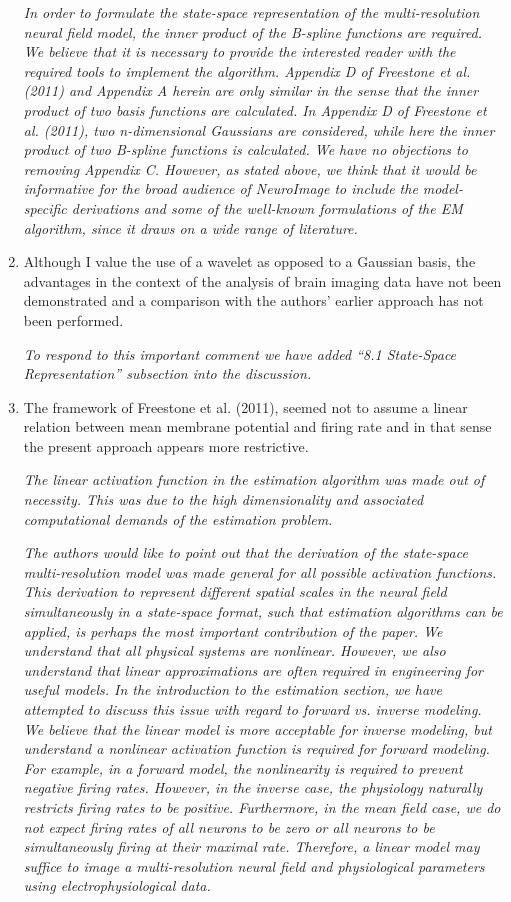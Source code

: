 \documentclass{article}
\begin{document}
\begin{enumerate}
\emph{In order to formulate the state-space representation of the multi-resolution neural field model, the inner product of the B-spline functions are required. We believe that it is necessary to provide the interested reader with the required tools to implement the algorithm. Appendix D of Freestone et al. (2011) and Appendix A herein are only similar in the sense that the inner product of two basis functions are calculated. In Appendix D of Freestone et al. (2011), two  n-dimensional Gaussians are considered, while here the inner product of two B-spline functions is calculated. We have no objections to removing Appendix C. However, as stated above, we think that it would be informative for the broad audience of NeuroImage to include the model-specific derivations and some of the well-known formulations of the EM algorithm, since it draws on a wide range of literature.}

        \item Although I value the use of a wavelet as opposed to a Gaussian basis, the advantages in the context of the analysis of brain imaging data have not been demonstrated and a comparison with the authors' earlier approach has not been performed.  

\emph{To respond to this important comment we have added ``8.1 State-Space Representation'' subsection into the discussion.}

		\item{The framework of Freestone et al. (2011), seemed not to assume a linear relation between mean membrane potential and firing rate and in that sense the present approach appears more restrictive.}

\emph{The linear activation function in the estimation algorithm was made out of necessity. This was due to the high dimensionality and associated computational demands of the estimation problem.}

\emph{The authors would like to point out that the derivation of the state-space multi-resolution model was made general for all possible activation functions. This derivation to represent different spatial scales in the neural field simultaneously in a state-space format, such that estimation algorithms can be applied, is perhaps the most important contribution of the paper. We understand that all physical systems are nonlinear. However, we also understand that linear approximations are often required in engineering for useful models. In the introduction to the estimation section, we have attempted to discuss this issue with regard to forward vs. inverse modeling. We believe that the linear model is more acceptable for inverse modeling, but understand a nonlinear activation function is required for forward modeling. For example, in a forward model, the nonlinearity is required to prevent negative firing rates. However, in the inverse case, the physiology naturally restricts firing rates to be positive. Furthermore, in the mean field case, we do not expect firing rates of all neurons to be zero or all neurons to be simultaneously firing at their maximal rate. Therefore, a linear model may suffice to image a multi-resolution neural field and physiological parameters using electrophysiological data.}
				

\end{enumerate}
\end{document}
